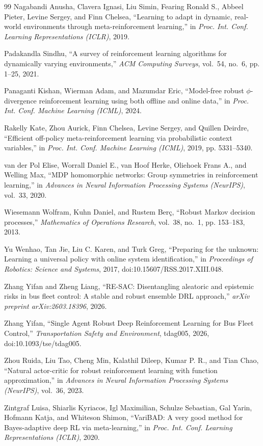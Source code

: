 \begin{thebibliography}{99}
{Nagabandi Anusha}, {Clavera Ignasi}, {Liu Simin}, {Fearing Ronald S.}, {Abbeel Pieter}, {Levine Sergey}, and {Finn Chelsea}, ``Learning to adapt in dynamic, real-world environments through meta-reinforcement learning,'' in \emph{Proc. Int. Conf. Learning Representations (ICLR)}, 2019.

{Padakandla Sindhu}, ``A survey of reinforcement learning algorithms for dynamically varying environments,'' \emph{ACM Computing Surveys}, vol.~54, no.~6, pp. 1--25, 2021.

{Panaganti Kishan}, {Wierman Adam}, and {Mazumdar Eric}, ``Model-free robust $\phi$-divergence reinforcement learning using both offline and online data,'' in \emph{Proc. Int. Conf. Machine Learning (ICML)}, 2024.

{Rakelly Kate}, {Zhou Aurick}, {Finn Chelsea}, {Levine Sergey}, and {Quillen Deirdre}, ``Efficient off-policy meta-reinforcement learning via probabilistic context variables,'' in \emph{Proc. Int. Conf. Machine Learning (ICML)}, 2019, pp. 5331--5340.

{van der Pol Elise}, {Worrall Daniel E.}, {van Hoof Herke}, {Oliehoek Frans A.}, and {Welling Max}, ``MDP homomorphic networks: Group symmetries in reinforcement learning,'' in \emph{Advances in Neural Information Processing Systems (NeurIPS)}, vol.~33, 2020.

{Wiesemann Wolfram}, {Kuhn Daniel}, and {Rustem Ber\c c}, ``Robust Markov decision processes,'' \emph{Mathematics of Operations Research}, vol.~38, no.~1, pp. 153--183, 2013.

{Yu Wenhao}, {Tan Jie}, {Liu C. Karen}, and {Turk Greg}, ``Preparing for the unknown: Learning a universal policy with online system identification,'' in \emph{Proceedings of Robotics: Science and Systems}, 2017, doi:10.15607/RSS.2017.XIII.048.

{Zhang Yifan} and {Zheng Liang}, ``RE-SAC: Disentangling aleatoric and epistemic risks in bus fleet control: A stable and robust ensemble DRL approach,'' \emph{arXiv preprint arXiv:2603.18396}, 2026.

{Zhang Yifan}, ``Single Agent Robust Deep Reinforcement Learning for Bus Fleet Control,'' \emph{Transportation Safety and Environment}, tdag005, 2026, doi:10.1093/tse/tdag005.

{Zhou Ruida}, {Liu Tao}, {Cheng Min}, {Kalathil Dileep}, {Kumar P. R.}, and {Tian Chao}, ``Natural actor-critic for robust reinforcement learning with function approximation,'' in \emph{Advances in Neural Information Processing Systems (NeurIPS)}, vol.~36, 2023.

{Zintgraf Luisa}, {Shiarlis Kyriacos}, {Igl Maximilian}, {Schulze Sebastian}, {Gal Yarin}, {Hofmann Katja}, and {Whiteson Shimon}, ``VariBAD: A very good method for Bayes-adaptive deep RL via meta-learning,'' in \emph{Proc. Int. Conf. Learning Representations (ICLR)}, 2020.

\end{thebibliography}
